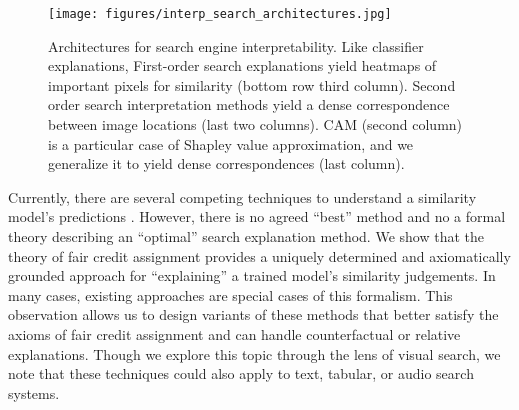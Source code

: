 \documentclass{article} %
\begin{document}
\begin{figure}
    \centering
    \texttt{[image: figures/interp\_search\_architectures.jpg]}
    \vspace{-.3in}
    \caption{Architectures for search engine interpretability. Like classifier explanations, First-order search explanations yield heatmaps of important pixels for similarity (bottom row third column). Second order search interpretation methods yield a dense correspondence between image locations (last two columns). CAM (second column) is a particular case of Shapley value approximation, and we generalize it to yield dense correspondences (last column).}
    \label{fig:shap_architecture}
    \vspace{-.15in}
\end{figure}


 Currently, there are several competing techniques to understand a similarity model's predictions \citep{vedml,vesm,sbsm,gradcam,transformers}. However, there is no agreed ``best'' method and no a formal theory describing an ``optimal'' search explanation method. We show that the theory of fair credit assignment provides a uniquely determined and axiomatically grounded approach for ``explaining'' a trained model's similarity judgements. In many cases, existing approaches are special cases of this formalism. This observation allows us to design variants of these methods that better satisfy the axioms of fair credit assignment and can handle counterfactual or relative explanations. Though we explore this topic through the lens of visual search, we note that these techniques could also apply to text, tabular, or audio search systems.
 
 
\end{document}
